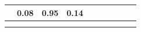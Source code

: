 \documentclass[11pt]{article}
\begin{document}
\begin{table}[ht]
\begin{tabular}{|l||l|l|l||l|l|l||l|l|l|}
\hline
    \tiny{\cite{strapparava2008learning} } &
    \footnotesize{0.08} & 
    \footnotesize{\textbf{0.95}} & 
    \footnotesize{0.14} &
    &
    &
    &
    &
    &
    \\

\hline
    \tiny{\cite{kim2010evaluation} } &
    & 
    & 
    &
    &
    &
    &
    &
    &
    \\
    
\hline
    \tiny{\cite{danisman2008feeler} } &
    \footnotesize{} & 
    \footnotesize{} & 
    \footnotesize{} &
    \footnotesize{} & 
    \footnotesize{} & 
    \footnotesize{} &
    \footnotesize{} & 
    \footnotesize{} & 
    \footnotesize{} \\

\hline
%    
%
%
%
%
%    

\end{tabular}
\end{table}
\end{document}
